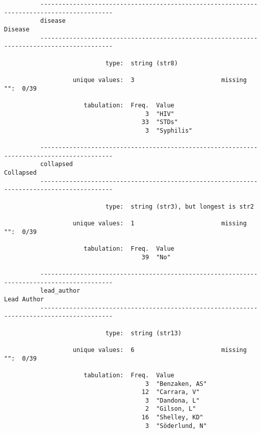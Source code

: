 \documentclass{article}
\begin{document}
\begin{verbatim}
          
          
          
          ------------------------------------------------------------------------------------------
          disease                                                                            Disease
          ------------------------------------------------------------------------------------------
          
                            type:  string (str8)
          
                   unique values:  3                        missing "":  0/39
          
                      tabulation:  Freq.  Value
                                       3  "HIV"
                                      33  "STDs"
                                       3  "Syphilis"
          
          ------------------------------------------------------------------------------------------
          collapsed                                                                        Collapsed
          ------------------------------------------------------------------------------------------
          
                            type:  string (str3), but longest is str2
          
                   unique values:  1                        missing "":  0/39
          
                      tabulation:  Freq.  Value
                                      39  "No"
          
          ------------------------------------------------------------------------------------------
          lead_author                                                                    Lead Author
          ------------------------------------------------------------------------------------------
          
                            type:  string (str13)
          
                   unique values:  6                        missing "":  0/39
          
                      tabulation:  Freq.  Value
                                       3  "Benzaken, AS"
                                      12  "Carrara, V"
                                       3  "Dandona, L"
                                       2  "Gilson, L"
                                      16  "Shelley, KD"
                                       3  "Söderlund, N"
          

\end{verbatim}
\end{document}
